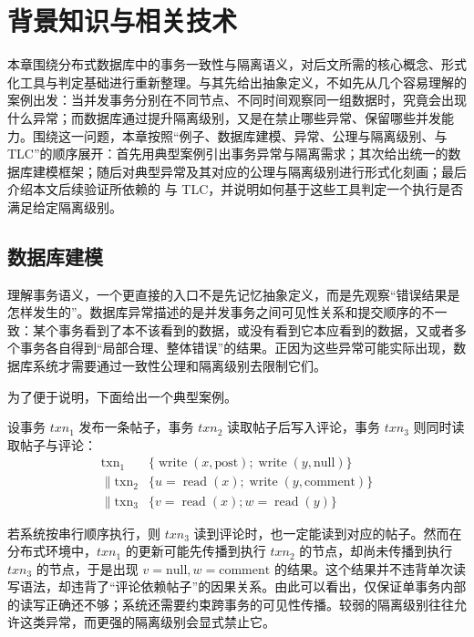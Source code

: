 \chapter{背景知识与相关技术}

本章围绕分布式数据库中的事务一致性与隔离语义，对后文所需的核心概念、形式化工具与判定基础进行重新整理。与其先给出抽象定义，不如先从几个容易理解的案例出发：当并发事务分别在不同节点、不同时间观察同一组数据时，究竟会出现什么异常；而数据库通过提升隔离级别，又是在禁止哪些异常、保留哪些并发能力。围绕这一问题，本章按照“例子、数据库建模、异常、公理与隔离级别、\TLAPlus 与 TLC”的顺序展开：首先用典型案例引出事务异常与隔离需求；其次给出统一的数据库建模框架；随后对典型异常及其对应的公理与隔离级别进行形式化刻画；最后介绍本文后续验证所依赖的 \TLAPlus 与 TLC，并说明如何基于这些工具判定一个执行是否满足给定隔离级别。


\section{数据库建模}

理解事务语义，一个更直接的入口不是先记忆抽象定义，而是先观察“错误结果是怎样发生的”。数据库异常描述的是并发事务之间可见性关系和提交顺序的不一致：某个事务看到了本不该看到的数据，或没有看到它本应看到的数据，又或者多个事务各自得到“局部合理、整体错误”的结果。正因为这些异常可能实际出现，数据库系统才需要通过一致性公理和隔离级别去限制它们。

为了便于说明，下面给出一个典型案例。

设事务 $txn_1$ 发布一条帖子，事务 $txn_2$ 读取帖子后写入评论，事务 $txn_3$ 则同时读取帖子与评论：
\begin{equation}
    \begin{aligned}
        \operatorname{txn_1}    & \{\operatorname{write}(x, \text{post}); \operatorname{write}(y, \text{null})\} \\
        \| \operatorname{txn_2} & \{u=\operatorname{read}(x) ; \operatorname{write}(y, \text{comment})\}         \\
        \| \operatorname{txn_3} & \{v=\operatorname{read}(x) ; w=\operatorname{read}(y)\}
    \end{aligned}
\end{equation}

若系统按串行顺序执行，则 $txn_3$ 读到评论时，也一定能读到对应的帖子。然而在分布式环境中，$txn_1$ 的更新可能先传播到执行 $txn_2$ 的节点，却尚未传播到执行 $txn_3$ 的节点，于是出现 $v=\text{null}, w=\text{comment}$ 的结果。这个结果并不违背单次读写语法，却违背了“评论依赖帖子”的因果关系。由此可以看出，仅保证单事务内部的读写正确还不够；系统还需要约束跨事务的可见性传播。较弱的隔离级别往往允许这类异常，而更强的隔离级别会显式禁止它。

